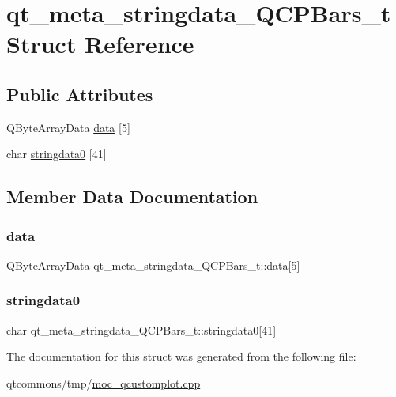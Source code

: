 \hypertarget{structqt__meta__stringdata___q_c_p_bars__t}{}\section{qt\+\_\+meta\+\_\+stringdata\+\_\+\+Q\+C\+P\+Bars\+\_\+t Struct Reference}
\label{structqt__meta__stringdata___q_c_p_bars__t}
\subsection*{Public Attributes}
\begin{DoxyCompactItemize}
\item 
Q\+Byte\+Array\+Data \mbox{\hyperlink{structqt__meta__stringdata___q_c_p_bars__t_a0bacafe95bf6996582d96c7f9cd72899}{data}} \mbox{[}5\mbox{]}
\item 
char \mbox{\hyperlink{structqt__meta__stringdata___q_c_p_bars__t_a819498ecb3c6e73de180a3b4c4ad83e7}{stringdata0}} \mbox{[}41\mbox{]}
\end{DoxyCompactItemize}


\subsection{Member Data Documentation}
\mbox{\label{structqt__meta__stringdata___q_c_p_bars__t_a0bacafe95bf6996582d96c7f9cd72899}} 
\subsubsection{\texorpdfstring{data}{data}}
{\footnotesize\ttfamily Q\+Byte\+Array\+Data qt\+\_\+meta\+\_\+stringdata\+\_\+\+Q\+C\+P\+Bars\+\_\+t\+::data\mbox{[}5\mbox{]}}

\mbox{\label{structqt__meta__stringdata___q_c_p_bars__t_a819498ecb3c6e73de180a3b4c4ad83e7}} 
\subsubsection{\texorpdfstring{stringdata0}{stringdata0}}
{\footnotesize\ttfamily char qt\+\_\+meta\+\_\+stringdata\+\_\+\+Q\+C\+P\+Bars\+\_\+t\+::stringdata0\mbox{[}41\mbox{]}}



The documentation for this struct was generated from the following file\+:\begin{DoxyCompactItemize}
\item 
qtcommons/tmp/\mbox{\hyperlink{moc__qcustomplot_8cpp}{moc\+\_\+qcustomplot.\+cpp}}\end{DoxyCompactItemize}
